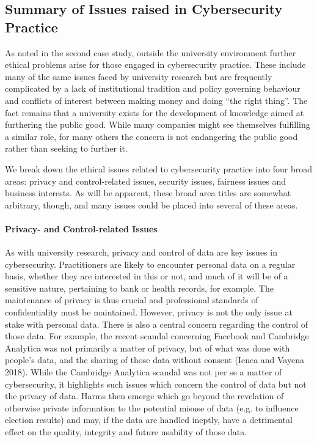 \documentclass{svjour3}                     %
\begin{document}
\subsection{Summary of Issues raised in Cybersecurity Practice}
\label{sec:industryissues}
As noted in the second case study, outside the university environment further ethical problems arise for those engaged in cybersecurity practice.  These include many of the same issues faced by university research but are frequently complicated by a lack of institutional tradition and policy governing behaviour and conflicts of interest between making money and doing “the right thing”. The fact remains that a university exists for the development of knowledge aimed at furthering the public good.  While many companies might see themselves fulfilling a similar role, for many others the concern is not endangering the public good rather than seeking to further it.

We break down the ethical issues related to cybersecurity practice into four broad areas: privacy and control-related issues, security issues, fairness issues and business interests. As will be apparent, these broad area titles are somewhat arbitrary, though, and many issues could be placed into several of these areas.

\paragraph{Privacy- and Control-related Issues}
As with university research, privacy and control of data are key issues in cybersecurity. Practitioners are likely to encounter personal data on a regular basis, whether they are interested in this or not, and much of it will be of a sensitive nature, pertaining to bank or health records, for example.  The maintenance of privacy is thus crucial and professional standards of confidentiality must be maintained. However, privacy is not the only issue at stake with personal data. There is also a central concern regarding the control of those data. For example, the recent scandal concerning Facebook and Cambridge Analytica was not primarily a matter of privacy, but of what was done with people’s data, and the sharing of those data without consent (Ienca and Vayena 2018). While the Cambridge Analytica scandal was not per se a matter of cybersecurity, it highlights such issues which concern the control of data but not the privacy of data. Harms then emerge which go beyond the revelation of otherwise private information to the potential misuse of data (e.g. to influence election results) and may, if the data are handled ineptly, have a detrimental effect on the quality, integrity and future usability of those data.
\end{document}

